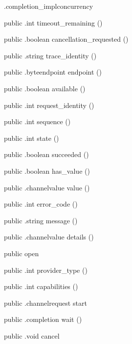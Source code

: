 \begin{CrexxClass}{.completion\_impl}{concurrency}
\begin{Members}
    \Method
      {public}
      {.int}
      {timeout\_remaining}
      {()}

    \Method
      {public}
      {.boolean}
      {cancellation\_requested}
      {()}

    \Method
      {public}
      {.string}
      {trace\_identity}
      {()}

    \Method
      {public}
      {.byteendpoint}
      {endpoint}
      {()}

    \Method
      {public}
      {.boolean}
      {available}
      {()}

    \Method
      {public}
      {.int}
      {request\_identity}
      {()}

    \Method
      {public}
      {.int}
      {sequence}
      {()}

    \Method
      {public}
      {.int}
      {state}
      {()}

    \Method
      {public}
      {.boolean}
      {succeeded}
      {()}

    \Method
      {public}
      {.boolean}
      {has\_value}
      {()}

    \Method
      {public}
      {.channelvalue}
      {value}
      {()}

    \Method
      {public}
      {.int}
      {error\_code}
      {()}

    \Method
      {public}
      {.string}
      {message}
      {()}

    \Method
      {public}
      {.channelvalue}
      {details}
      {()}

    \Factory
      {public}
      {open}
      {}

    \Method
      {public}
      {.int}
      {provider\_type}
      {()}

    \Method
      {public}
      {.int}
      {capabilities}
      {()}

    \Method
      {public}
      {.channelrequest}
      {start}
      {}

    \Method
      {public}
      {.completion}
      {wait}
      {()}

    \Method
      {public}
      {.void}
      {cancel}
      {}


\end{Members}
\end{CrexxClass}
